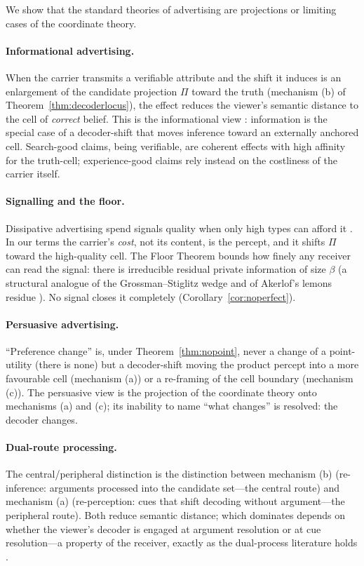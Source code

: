 \documentclass[twocolumn,11pt,a4paper]{article}
\theoremstyle{adv}
\theoremstyle{definition}
\theoremstyle{remark}
\newcommand{\Proj}{\Pi}                %
\newcommand{\floor}{\beta}            %
\begin{document}
We show that the standard theories of advertising are projections or
limiting cases of the coordinate theory.

\paragraph{Informational advertising.}
When the carrier transmits a verifiable attribute and the shift it induces
is an enlargement of the candidate projection $\Proj$ toward the truth
(mechanism (b) of Theorem~\ref{thm:decoderlocus}), the effect reduces the
viewer's semantic distance to the cell of \emph{correct} belief. This is
the informational view \citep{stigler1961,nelson1974}: information is the
special case of a decoder-shift that moves inference toward an externally
anchored cell. Search-good claims, being verifiable, are coherent effects
with high affinity for the truth-cell; experience-good claims rely instead
on the costliness of the carrier itself.

\paragraph{Signalling and the floor.}
Dissipative advertising spend signals quality when only high types can
afford it \citep{spence1973,milgrom1986}. In our terms the carrier's
\emph{cost}, not its content, is the percept, and it shifts $\Proj$ toward
the high-quality cell. The Floor Theorem bounds how finely any receiver can
read the signal: there is irreducible residual private information of size
$\floor$ (a structural analogue of the Grossman--Stiglitz wedge
\citep{grossman1980} and of Akerlof's lemons residue \citep{akerlof1970}).
No signal closes it completely (Corollary~\ref{cor:noperfect}).

\paragraph{Persuasive advertising.}
``Preference change'' is, under Theorem~\ref{thm:nopoint}, never a change
of a point-utility (there is none) but a decoder-shift moving the product
percept into a more favourable cell (mechanism (a)) or a re-framing of the
cell boundary (mechanism (c)). The persuasive view \citep{dixit1978,
bagwell2007} is the projection of the coordinate theory onto
mechanisms (a) and (c); its inability to name ``what changes'' is resolved:
the decoder changes.

\paragraph{Dual-route processing.}
The central/peripheral distinction \citep{petty1983} is the distinction
between mechanism (b) (re-inference: arguments processed into the candidate
set---the central route) and mechanism (a) (re-perception: cues that shift
decoding without argument---the peripheral route). Both reduce semantic
distance; which dominates depends on whether the viewer's decoder is
engaged at argument resolution or at cue resolution---a property of the
receiver, exactly as the dual-process literature holds \citep{kahneman2011}.
\end{document}

